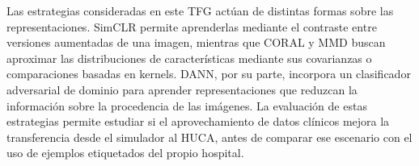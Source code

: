 Las estrategias consideradas en este TFG actúan de distintas formas sobre las representaciones. SimCLR permite aprenderlas mediante el contraste entre versiones aumentadas de una imagen, mientras que CORAL y MMD buscan aproximar las distribuciones de características mediante sus covarianzas o comparaciones basadas en kernels. DANN, por su parte, incorpora un clasificador adversarial de dominio para aprender representaciones que reduzcan la información sobre la procedencia de las imágenes. La evaluación de estas estrategias permite estudiar si el aprovechamiento de datos clínicos mejora la transferencia desde el simulador al HUCA, antes de comparar ese escenario con el uso de ejemplos etiquetados del propio hospital. \cite{chen2020simclr,sun2016deepcoral,long2015dan,ganin2016}
